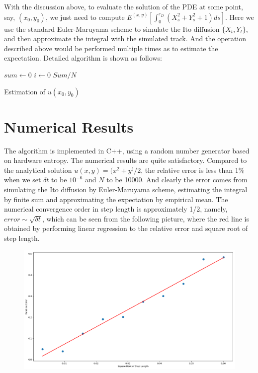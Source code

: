 \documentclass[a4paper]{article}
\begin{document}
With the discussion above, to evaluate the solution of the PDE at some point, say, $(x_0, y_0)$, we just need to compute $E^{(x,y)}[\int_0^{\tau_D}(X_s^2+Y_s^2+1)ds]$. Here we use the standard Euler-Maruyama scheme to simulate the Ito diffusion $\{X_t, Y_t\}$, and then approximate the integral with the simulated track. And the operation described above would be performed multiple times as to estimate the expectation. Detailed algorithm is shown as follows:

\begin{algorithm}
\DontPrintSemicolon %
$sum \gets 0$\;
$i \gets 0$\;
\Return $Sum/N$\;
\caption{{\sc Estimation of $u(x_0,y_0)$}}
\end{algorithm}

\section{Numerical Results}
The algorithm is implemented in C++, using a random number generator based on hardware entropy. The numerical results are quite satisfactory. Compared to the analytical solution $u(x,y)=(x^2 + y^)/2$, the relative error is less than 1\% when we set $\delta t$ to be $10^{-6}$ and $N$ to be 10000. And clearly the error comes from simulating the Ito diffusion by Euler-Maruyama scheme, estimating the integral by finite sum and approximating the expectation by empirical mean. The numerical convergence order in step length is approximately 1/2, namely, $error\sim\sqrt{\delta t}$, which can be seen from the following picture, where the red line is obtained by performing linear regression to the relative error and square root of step length. 

\begin{figure}[ht]

\centering
\includegraphics[scale=0.4]{LR.png}

\end{figure}



\end{document}
